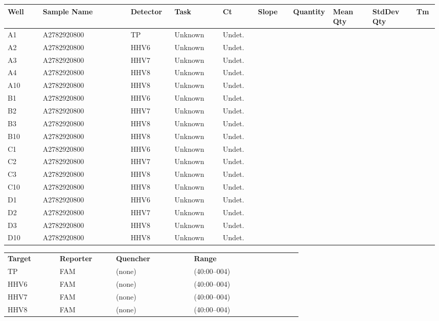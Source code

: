 \documentclass[UTF8,10pt,a4paper,fontset=fandol]{ctexart}
\begin{document}
\begin{center}
\small
\begin{tabular}{@{}p{0.08\linewidth}p{0.20\linewidth}p{0.10\linewidth}p{0.11\linewidth}p{0.08\linewidth}p{0.08\linewidth}p{0.09\linewidth}p{0.09\linewidth}p{0.10\linewidth}p{0.05\linewidth}@{}}
\textbf{Well} & \textbf{Sample Name} & \textbf{Detector} & \textbf{Task} & \textbf{Ct} & \textbf{Slope} & \textbf{Quantity} & \textbf{Mean Qty} & \textbf{StdDev Qty} & \textbf{Tm} \\
\hline
A1  & A2782920800 & TP   & Unknown & Undet. & & & & & \\
A2  & A2782920800 & HHV6 & Unknown & Undet. & & & & & \\
A3  & A2782920800 & HHV7 & Unknown & Undet. & & & & & \\
A4  & A2782920800 & HHV8 & Unknown & Undet. & & & & & \\
A10 & A2782920800 & HHV8 & Unknown & Undet. & & & & & \\
\hline
B1  & A2782920800 & HHV6 & Unknown & Undet. & & & & & \\
B2  & A2782920800 & HHV7 & Unknown & Undet. & & & & & \\
B3  & A2782920800 & HHV8 & Unknown & Undet. & & & & & \\
B10 & A2782920800 & HHV8 & Unknown & Undet. & & & & & \\
\hline
C1  & A2782920800 & HHV6 & Unknown & Undet. & & & & & \\
C2  & A2782920800 & HHV7 & Unknown & Undet. & & & & & \\
C3  & A2782920800 & HHV8 & Unknown & Undet. & & & & & \\
C10 & A2782920800 & HHV8 & Unknown & Undet. & & & & & \\
\hline
D1  & A2782920800 & HHV6 & Unknown & Undet. & & & & & \\
D2  & A2782920800 & HHV7 & Unknown & Undet. & & & & & \\
D3  & A2782920800 & HHV8 & Unknown & Undet. & & & & & \\
D10 & A2782920800 & HHV8 & Unknown & Undet. & & & & & \\
\hline
\end{tabular}

\vspace{1em}

\begin{tabular}{@{}p{0.12\linewidth}p{0.12\linewidth}p{0.18\linewidth}p{0.25\linewidth}@{}}
\textbf{Target} & \textbf{Reporter} & \textbf{Quencher} & \textbf{Range} \\
TP   & FAM & (none) & (40:00--004) \\
HHV6 & FAM & (none) & (40:00--004) \\
HHV7 & FAM & (none) & (40:00--004) \\
HHV8 & FAM & (none) & (40:00--004) \\
\end{tabular}
\end{center}
\end{document}
